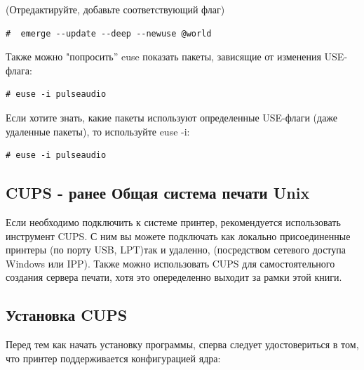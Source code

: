 \documentclass[10pt]{book}
\begin{document}
(Отредактируйте, добавьте соответствующий флаг)

\begin{tcolorbox}
\begin{lstlisting}
#  emerge --update --deep --newuse @world
\end{lstlisting}
\end{tcolorbox}

Также можно "попросить'' euse показать пакеты, зависящие от изменения USE-флага:

\begin{tcolorbox}
\begin{lstlisting}
# euse -i pulseaudio
\end{lstlisting}
\end{tcolorbox}

Если хотите знать, какие пакеты используют определенные USE-флаги (даже удаленные пакеты), то используйте euse -i:

\begin{tcolorbox}
\begin{lstlisting}
# euse -i pulseaudio
\end{lstlisting}
\end{tcolorbox}

\subsection{CUPS - ранее Общая система печати Unix}

Если необходимо подключить к системе принтер, рекомендуется использовать инструмент CUPS. С ним вы можете подключать как локально присоединенные принтеры (по порту USB, LPT)так и удаленно, (посредством сетевого доступа Windows или IPP). Также можно использовать CUPS для самостоятельного создания сервера печати, хотя это опеределенно выходит за рамки этой книги.

\subsection{Установка CUPS}

Перед тем как начать установку программы, сперва следует удостовериться в том, что принтер поддерживается конфигурацией ядра:
\end{document}
